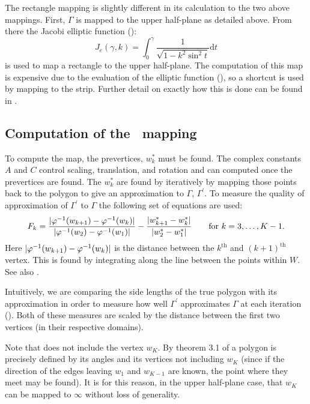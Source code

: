 The rectangle mapping is slightly different in its calculation to the two above mappings. First, $\Gamma$ is mapped to the upper half-plane as detailed above. From there the Jacobi elliptic function (\cite[p. 701]{handbuch}):
\begin{equation*}
J_e(\gamma,k)=\int_0^\gamma \frac{1}{\sqrt{1-k^2\sin^2t}} \text{d} t
\end{equation*}
is used to map a rectangle to the upper half-plane. The computation of this map is expensive due to the evaluation of the elliptic function (\cite[p. 49]{driscoll}), so a shortcut is used by mapping to the strip. Further detail on exactly how this is done can be found in .

\subsection{Computation of the \sch\ mapping}
\label{sc-mapping-problem}

To compute the map, the prevertices, $w^*_k$ must be found. The complex constants $A$ and $C$ control scaling, translation, and rotation and can computed once the prevertices are found. The $w^*_k$ are found by iteratively by mapping those points back to the polygon to give an approximation to $\Gamma$, $\Gamma^\prime$. To measure the quality of approximation of $\Gamma^\prime$ to $\Gamma$ the following set of equations are used:
\begin{equation}
\label{optimizeme}
F_k = \frac{\vert \varphi^{-1}(w_{k+1}) -  \varphi^{-1}(w_k) \vert}{\vert \varphi^{-1}(w_2)-\varphi^{-1}(w_1)\vert} - \frac{\vert w^*_{k+1} - w^*_k\vert}{\vert w^*_2 - w^*_1\vert} \qquad \text{for } k=3,\dots,K-1.
\end{equation}
Here $\vert \varphi^{-1}(w_{k+1}) -  \varphi^{-1}(w_k) \vert$ is the distance between the $k^{\text{th}}$ and $(k+1)^{\text{th}}$ vertex. This is found by integrating along the line between the points within $W$. See also .

Intuitively, we are comparing the side lengths of the true polygon with its approximation in order to measure how well $\Gamma^\prime$ approximates $\Gamma$ at each iteration (\cite[A-3]{snider}). Both of these measures are scaled by the distance between the first two vertices (in their respective domains).

Note that  does not include the vertex $w_K$. By theorem 3.1 of \cite[p. 24]{driscoll} a polygon is precisely defined by its angles and its vertices not including $w_K$ (since if the direction of the edges leaving $w_1$ and $w_{K-1}$ are known, the point where they meet may be found). It is for this reason, in the upper half-plane case, that $w_K$ can be mapped to $\infty$ without loss of generality.

